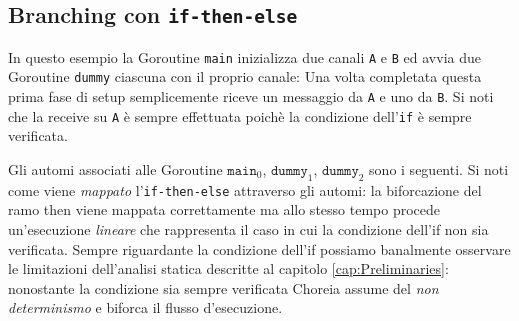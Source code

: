 \subsection{Branching con \texttt{if-then-else}}
In questo esempio la Goroutine \texttt{main} inizializza due canali \texttt{A} e \texttt{B} ed avvia due Goroutine \texttt{dummy} ciascuna con il proprio canale: Una volta completata questa prima fase di setup semplicemente riceve un messaggio da \texttt{A} e uno da \texttt{B}. Si noti che la receive su \texttt{A} è sempre effettuata poichè la condizione dell'\texttt{if} è sempre verificata.

Gli automi associati alle Goroutine $\texttt{main}_0$, $\texttt{dummy}_1$, $\texttt{dummy}_2$ sono i seguenti. Si noti come viene \emph{mappato} l'\texttt{if-then-else} attraverso gli automi: la biforcazione del ramo then viene mappata correttamente ma allo stesso tempo procede un'esecuzione \emph{lineare} che rappresenta il caso in cui la condizione dell'if non sia verificata. Sempre riguardante la condizione dell'if possiamo banalmente osservare le limitazioni dell'analisi statica descritte al capitolo \ref{cap:Preliminaries}: nonostante la condizione sia sempre verificata Choreia assume del \emph{non determinismo} e biforca il flusso d'esecuzione.
\newpage %
\begin{figure}[t!]
    \centering
\end{figure}

